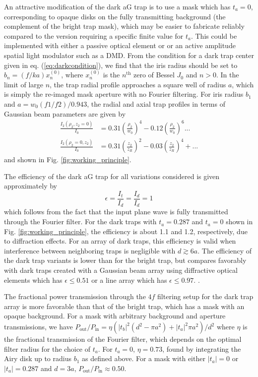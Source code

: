 An attractive modification of the dark aG trap is to use a mask which has $t_a=0$, corresponding to opaque disks on the fully transmitting background (the complement of the bright trap mask), which may be easier to fabricate reliably compared to the version requiring a specific finite value for $t_a$. This could be implemented with either a passive optical element or or an active amplitude spatial light modulator such as a DMD. From the condition for a dark trap center given in eq. (\ref{eq:darkcondition}), we find that the iris radius should be set to $b_n=(f/ka)x_n^{(0)}$, where $x_n^{(0)}$ is the $n^{\text {th}}$ zero of Bessel $J_0$ and $n>0$. In the limit of large $n$, the trap radial profile   approaches a square well of radius $a$, which is simply the re-imaged mask aperture with no Fourier filtering. For iris radius $b_1$ and $a=w_0(f1/f2)/0.943$, the radial and axial trap profiles in terms of Gaussian beam parameters are given by
\begin{equation} \label{eq:Iag_dark3}
    \begin{aligned}
    \frac{I_2(\rho_2,z_2=0)}{I_0} &= 0.31 \left(\frac{\rho_2}{w_0}\right)^4 - 0.12 \left(\frac{\rho_2}{w_0}\right)^6... \\
    \frac{I_2(\rho_2=0,z_2)}{I_0} &= 0.31 \left(\frac{z_2}{z_R}\right)^2 - 0.03 \left(\frac{z_2}{z_R}\right)^4 + ...
    \end{aligned}
\end{equation}
and  shown in Fig. \ref{fig:working_principle}. 

The efficiency of the dark aG trap for all variations considered is given approximately by
\begin{equation}
\epsilon=\frac{I_{t}}{I_{d}}=\frac{I_{d}}{I_{d}}=1
\end{equation}
which follows from the fact that the input plane wave is fully transmitted through the Fourier filter. For the dark traps with $t_a=0.287$ and $t_a=0$ shown in Fig. \ref{fig:working_principle}, the efficiency is about 1.1 and 1.2, respectively, due to diffraction effects. For an array of dark traps, this efficiency is valid when interference between neighboring traps is negligible with $d\gtrsim6a$. The efficiency of the dark trap variants is lower than for the bright trap, but compares favorably with dark traps created with a Gaussian beam array using diffractive optical elements which has $\epsilon \leq 0.51$ \cite{Piotrowicz2013} or a line array which
has $\epsilon \leq 0.97$. \cite{Saffmanlines}.

The fractional power transmission through the $4f$ filtering setup for the dark trap array is more favorable than that of the bright trap, which has a mask with an opaque background. For a mask with arbitrary background and aperture transmissions, we have $P_{\text {out}}/P_{\text {in}} = \eta(|t_b|^2(d^2 - \pi a^2) + |t_a|^2 \pi a^2)/d^2$ where $\eta$ is the fractional transmission of the Fourier filter, which depends on the optimal filter radius for the choice of $t_a$. For $t_a=0$,  $\eta=0.73$, found by integrating the Airy disk up to radius $b_1$ as defined above. For a mask with either $|t_a|=0$ or  $|t_a|=0.287$ and $d=3a$, $P_{\text {out}}/P_{\text {in}}\approx 0.50$.

